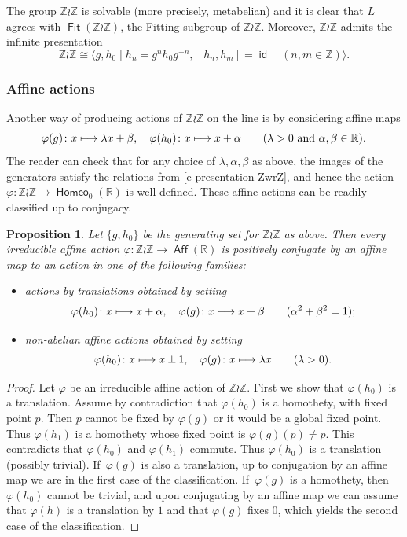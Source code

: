 \documentclass[10pt]{amsart}
\def\mto{\mathchoice{\longmapsto}{\mapsto}{\mapsto}{\mapsto}}
\newtheorem{prop}[thm]{Proposition}
\theoremstyle{definition}
\DeclareMathOperator{\Aff}{\mathsf{Aff}}
\DeclareMathOperator{\Fit}{\mathsf{Fit}}
\DeclareMathOperator{\homeo}{\mathsf{Homeo}}
\DeclareMathOperator{\id}{\mathsf{id}}
\newcommand{\R}{\mathbb{R}}
\newcommand{\Z}{\mathbb Z}
\begin{document}
The group $\Z\wr\Z$ is solvable (more precisely, metabelian) and it is clear that $L$ agrees with $\Fit(\Z\wr\Z)$, the Fitting subgroup of $\Z\wr\Z$. Moreover, $\Z\wr\Z$ admits the infinite presentation
\begin{equation}\Z\wr\Z\cong\langle g, h_0 \mid h_n=g^nh_0g^{-n}, \, [h_n, h_m]= \id \quad (n, m\in \Z)\rangle. \label{e-presentation-ZwrZ}\end{equation}

\subsubsection{Affine actions}
Another way of producing actions of $\Z\wr\Z$ on the line is by considering affine maps
\[\varphi(g) \colon x\mto \lambda x+\beta , \quad \varphi(h_0)\colon x\mto x+ \alpha \quad \quad (\lambda>0\text{ and } \alpha, \beta \in\R).
\]
The reader can check that for any choice of $\lambda,\alpha,\beta$ as above, the images of the generators satisfy the relations from \eqref{e-presentation-ZwrZ}, and hence the action $\varphi\colon\Z\wr\Z\to \homeo_0(\R)$ is well defined. These affine actions can be readily classified up to conjugacy.

\begin{prop} \label{l-wr-affine} Let $\{g,h_0\}$ be the generating set for $\Z\wr\Z$ as above. Then every irreducible affine action $\varphi\colon \Z \wr \Z\to \Aff(\R)$ is positively conjugate by an affine map to an action in one of the following families:
\begin{itemize}
\item actions by translations obtained by setting
\[\varphi(h_0)\colon x\mto x+\alpha, \quad \varphi(g)\colon x\mto x +\beta \quad \quad (\alpha^2+\beta^2=1);
\]
\item non-abelian affine actions obtained by setting
\[\varphi(h_0)\colon x\mto x\pm 1, \quad \varphi(g) \colon x\mto \lambda x\quad \quad (\lambda>0).
\]
\end{itemize}
\end{prop}
\begin{proof}
Let $\varphi$ be an irreducible affine action of $\Z\wr\Z$. First we show that $\varphi(h_0)$ is a translation. Assume by contradiction that $\varphi(h_0)$ is a homothety, with fixed point $p$. Then $p$ cannot be fixed by $\varphi(g)$ or it would be a global fixed point. Thus $\varphi(h_1)$ is a homothety whose fixed point is $\varphi(g)(p)\neq p$. This contradicts that $\varphi(h_0)$ and $\varphi(h_1)$ commute. Thus $\varphi(h_0)$ is a translation (possibly trivial). If~$\varphi(g)$ is also a translation, up to conjugation by an affine map we are in the first case of the classification. If~$\varphi(g)$ is a homothety, then $\varphi(h_0)$ cannot be trivial, and upon conjugating by an affine map we can assume that $\varphi(h)$ is a translation by $1$ and that $\varphi(g)$ fixes 0, which yields the second case of the classification.
\end{proof}
\end{document}
